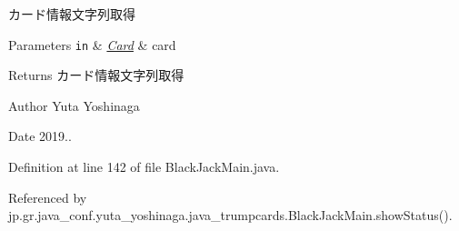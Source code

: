 カード情報文字列取得 


\begin{DoxyParams}[1]{Parameters}
\mbox{\tt in}  & {\em \hyperlink{classjp_1_1gr_1_1java__conf_1_1yuta__yoshinaga_1_1java__trumpcards_1_1_card}{Card}} & card \\
\hline
\end{DoxyParams}
\begin{DoxyReturn}{Returns}
カード情報文字列取得 
\end{DoxyReturn}
\begin{DoxyAuthor}{Author}
Yuta Yoshinaga 
\end{DoxyAuthor}
\begin{DoxyDate}{Date}
2019.. 
\end{DoxyDate}


Definition at line 142 of file Black\+Jack\+Main.\+java.



Referenced by jp.\+gr.\+java\+\_\+conf.\+yuta\+\_\+yoshinaga.\+java\+\_\+trumpcards.\+Black\+Jack\+Main.\+show\+Status().

